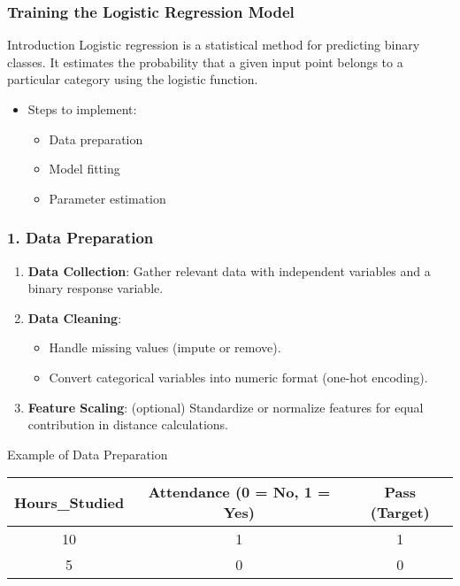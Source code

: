 \documentclass[aspectratio=169]{beamer}
\begin{document}
\begin{frame}
    \frametitle{Training the Logistic Regression Model}
    
    \begin{block}{Introduction}
        Logistic regression is a statistical method for predicting binary classes. It estimates the probability that a given input point belongs to a particular category using the logistic function.
    \end{block}
    
    \begin{itemize}
        \item Steps to implement:
            \begin{itemize}
                \item Data preparation
                \item Model fitting
                \item Parameter estimation
            \end{itemize}
    \end{itemize}
\end{frame}

\begin{frame}
    \frametitle{1. Data Preparation}

    \begin{enumerate}
        \item \textbf{Data Collection}: Gather relevant data with independent variables and a binary response variable.
        \item \textbf{Data Cleaning}:
            \begin{itemize}
                \item Handle missing values (impute or remove).
                \item Convert categorical variables into numeric format (one-hot encoding).
            \end{itemize}
        \item \textbf{Feature Scaling}: (optional) Standardize or normalize features for equal contribution in distance calculations.
    \end{enumerate}

    \begin{block}{Example of Data Preparation}
        \begin{tabular}{|c|c|c|}
            \hline
            Hours\_Studied & Attendance (0 = No, 1 = Yes) & Pass (Target) \\
            \hline
            10 & 1 & 1 \\
            5 & 0 & 0 \\
            \hline
        \end{tabular}
    \end{block}
\end{frame}
\end{document}
